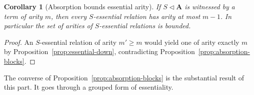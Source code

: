\documentclass[11pt]{article}
\theoremstyle{mainplain}
\newtheorem{corollary}[theorem]{Corollary}
\theoremstyle{mainroman}
\theoremstyle{definition}
\numberwithin{equation}{section}
\newcommand{\bA}{\mathbf A}
\newcommand{\ab}{\lhd}
\begin{document}
\begin{corollary}[Absorption bounds essential arity]\label{cor:absorption-bound}
If $S\ab\bA$ is witnessed by a term of arity $m$, then every $S$-essential
relation has arity at most $m-1$. In particular the set of arities of
$S$-essential relations is bounded.
\end{corollary}
\begin{proof}
An $S$-essential relation of arity $m'\ge m$ would yield one of arity exactly
$m$ by Proposition~\ref{prop:essential-down}, contradicting
Proposition~\ref{prop:absorption-blocks}.
\end{proof}

The converse of Proposition~\ref{prop:absorption-blocks} is the substantial
result of this part. It goes through a grouped form of essentiality.
\end{document}
